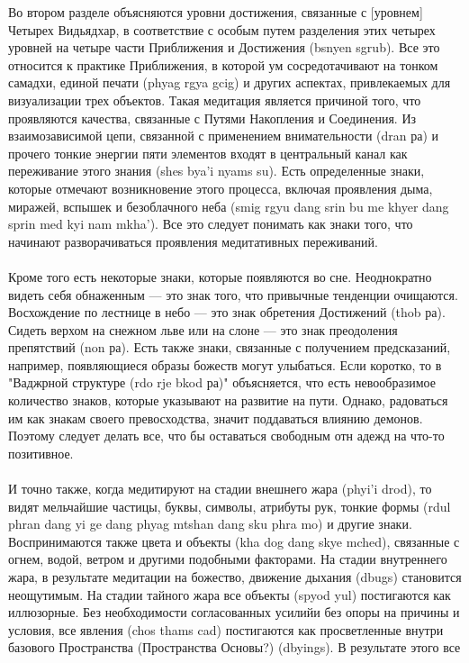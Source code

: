 Во втором разделе объясняются уровни достижения, связанные с [уровнем] Четырех
Видьядхар, в соответствие с особым путем разделения этих четырех уровней на четыре части
Приближения и Достижения (bsnyen sgrub). Все это относится к практике Приближения, в
которой ум сосредотачивают на тонком самадхи, единой печати (phyag rgya gcig) и других
аспектах, привлекаемых для визуализации трех объектов. Такая медитация является
причиной того, что проявляются качества, связанные с Путями Накопления и Соединения.
Из взаимозависимой цепи, связанной с применением внимательности (dran ра) и прочего
тонкие энергии пяти элементов входят в центральный канал как переживание этого знания
(shes bya'i nyams su). Есть определенные знаки, которые отмечают возникновение этого
процесса, включая проявления дыма, миражей, вспышек и безоблачного неба (smig rgyu dang
srin bu me khyer dang sprin med kyi nam mkha'). Все это следует понимать как знаки того, что
начинают разворачиваться проявления медитативных переживаний.\\
\\
Кроме того есть некоторые знаки, которые появляются во сне. Неоднократно видеть
себя обнаженным — это знак того, что привычные тенденции очищаются. Восхождение по
лестнице в небо — это знак обретения Достижений (thob ра). Сидеть верхом на снежном льве
или на слоне — это знак преодоления препятствий (non ра). Есть также знаки, связанные с
получением предсказаний, например, появляющиеся образы божеств могут улыбаться. Если
коротко, то в "Ваджрной структуре (rdo rje bkod ра)" объясняется, что есть невообразимое
количество знаков, которые указывают на развитие на пути. Однако, радоваться им как
знакам своего превосходства, значит поддаваться влиянию демонов. Поэтому следует делать
все, что бы оставаться свободным отн адежд на что-то позитивное.\\
\\
И точно также, когда медитируют на стадии внешнего жара (phyi'i drod), то видят
мельчайшие частицы, буквы, символы, атрибуты рук, тонкие формы (rdul phran dang yi ge
dang phyag mtshan dang sku phra mo) и другие знаки. Воспринимаются также цвета и объекты
(kha dog dang skye mched), связанные с огнем, водой, ветром и другими подобными
факторами. На стадии внутреннего жара, в результате медитации на божество, движение
дыхания (dbugs) становится неощутимым. На стадии тайного жара все объекты (spyod yul)
постигаются как иллюзорные. Без необходимости согласованных усилийи без опоры на
причины и условия, все явления (chos thams cad) постигаются как просветленные внутри
базового Пространства (Пространства Основы?) (dbyings). В результате этого все
